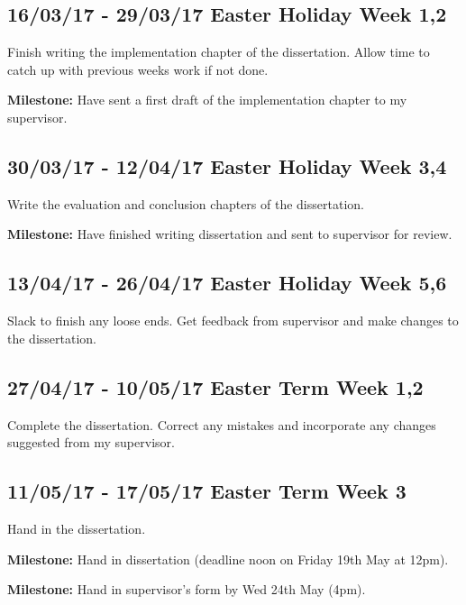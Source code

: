\documentclass[12pt,a4paper,twoside]{article}
\begin{document}
    \subsection*{16/03/17 - 29/03/17 \hfill Easter Holiday Week 1,2}

      Finish writing the implementation chapter of the dissertation.
      Allow time to catch up with previous weeks work if not done.

     \textbf{Milestone:} Have sent a first draft of the implementation chapter to my supervisor.

    \subsection*{30/03/17 - 12/04/17 \hfill Easter Holiday Week 3,4}

      Write the evaluation and conclusion chapters of the dissertation.

      \textbf{Milestone:} Have finished writing dissertation and sent to supervisor for review.

    \subsection*{13/04/17 - 26/04/17 \hfill Easter Holiday Week 5,6}

      Slack to finish any loose ends. Get feedback from supervisor and make changes to the dissertation.

    \subsection*{27/04/17 - 10/05/17 \hfill Easter Term Week 1,2}

      Complete the dissertation. Correct any mistakes and incorporate any changes suggested from my supervisor.


    \subsection*{11/05/17 - 17/05/17 \hfill Easter Term Week 3}
      Hand in the dissertation.

     \textbf{Milestone:} Hand in dissertation (deadline noon on Friday 19th May at 12pm).

     \textbf{Milestone:} Hand in supervisor's form by Wed 24th May (4pm).

     \printbibliography
\end{document}

